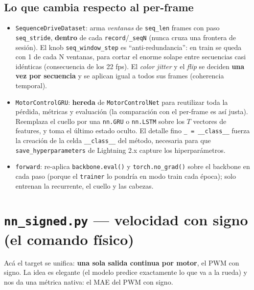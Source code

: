 \documentclass[11pt,a4paper]{article}
\newcommand{\code}[1]{\lstinline[basicstyle=\ttfamily\normalsize]|#1|}
\begin{document}
\subsection*{Lo que cambia respecto al per-frame}
\begin{itemize}
  \item \code{SequenceDriveDataset}: arma \emph{ventanas} de \code{seq_len} frames con paso \code{seq_stride},
  \textbf{dentro} de cada \code{record}/\code{_seqN} (nunca cruza una frontera de sesión). El knob
  \code{seq_window_step} es ``anti-redundancia'': en train se queda con 1 de cada N ventanas, para cortar el
  enorme solape entre secuencias casi idénticas (consecuencia de los 22 fps). El \emph{color jitter} y el
  \emph{flip} se deciden \textbf{una vez por secuencia} y se aplican igual a todos sus frames (coherencia
  temporal).
  \item \code{MotorControlGRU}: \textbf{hereda} de \code{MotorControlNet} para reutilizar toda la pérdida,
  métricas y evaluación (la comparación con el per-frame es así justa). Reemplaza el cuello por una
  \code{nn.GRU} o \code{nn.LSTM} sobre los $T$ vectores de features, y toma el último estado oculto. El detalle
  fino \code{_ = __class__} fuerza la creación de la celda \code{__class__} del método, necesaria para que
  \code{save_hyperparameters} de Lightning 2.x capture los hiperparámetros.
  \item \code{forward}: re-aplica \code{backbone.eval()} y \code{torch.no_grad()} sobre el backbone en cada
  paso (porque el \code{trainer} lo pondría en modo train cada época); solo entrenan la recurrente, el cuello
  y las cabezas.
\end{itemize}

\section{\texttt{nn\_signed.py} --- velocidad con signo (el comando físico)}
Acá el target se unifica: \textbf{una sola salida continua por motor}, el PWM con signo. La idea es elegante
(el modelo predice exactamente lo que va a la rueda) y nos da una métrica nativa: el MAE del PWM con signo.


\end{document}
